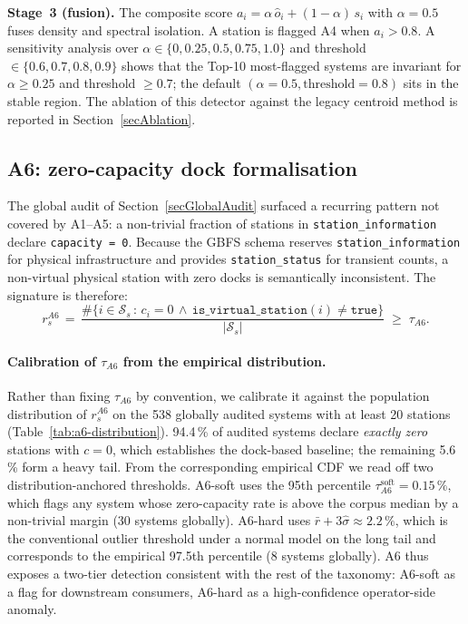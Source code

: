 \documentclass[11pt,a4paper]{article}
\begin{document}
\textbf{Stage~3 (fusion).} The composite score
$a_i = \alpha\,\hat o_i + (1 - \alpha)\,s_i$ with $\alpha = 0.5$
fuses density and spectral isolation. A station is flagged A4 when
$a_i > 0.8$. A sensitivity analysis over
$\alpha \in \{0, 0.25, 0.5, 0.75, 1.0\}$ and threshold
$\in \{0.6, 0.7, 0.8, 0.9\}$ shows that the Top-10 most-flagged
systems are invariant for $\alpha \ge 0.25$ and threshold $\ge 0.7$;
the default $(\alpha = 0.5, \text{threshold} = 0.8)$ sits in the
stable region. The ablation of this detector against the legacy
centroid method is reported in Section~\ref{secAblation}.

\subsection{A6: zero-capacity dock formalisation}\label{secA6Formalisation}
The global audit of Section~\ref{secGlobalAudit} surfaced a recurring
pattern not covered by A1--A5: a non-trivial fraction of stations in
\texttt{station\_information} declare \texttt{capacity = 0}. Because
the GBFS schema reserves \texttt{station\_information} for physical
infrastructure and provides \texttt{station\_status} for transient
counts, a non-virtual physical station with zero docks is
semantically inconsistent. The signature is therefore:
\begin{equation}
r_s^{A6} \,=\,
\frac{\#\{i \in \mathcal{S}_s \,:\, c_i = 0 \,\land\, \mathtt{is\_virtual\_station}(i) \neq \mathtt{true}\}}{|\mathcal{S}_s|}
\;\geq\; \tau_{A6}.
\end{equation}

\paragraph{Calibration of $\tau_{A6}$ from the empirical distribution.}
Rather than fixing $\tau_{A6}$ by convention, we calibrate it against
the population distribution of $r_s^{A6}$ on the 538 globally audited
systems with at least 20 stations
(Table~\ref{tab:a6-distribution}). 94.4\,\% of audited systems
declare \emph{exactly zero} stations with $c = 0$, which establishes
the dock-based baseline; the remaining 5.6\,\% form a heavy tail.
From the corresponding empirical CDF we read off two
distribution-anchored thresholds. A6-soft uses the 95th percentile
$\tau_{A6}^{\text{soft}} = 0.15\,\%$, which flags any system whose
zero-capacity rate is above the corpus median by a non-trivial
margin (30 systems globally). A6-hard uses $\bar r + 3\hat\sigma
\approx 2.2\,\%$, which is the conventional outlier threshold under
a normal model on the long tail and corresponds to the empirical
97.5th percentile (8 systems globally). A6 thus exposes a two-tier
detection consistent with the rest of the taxonomy: A6-soft as a
flag for downstream consumers, A6-hard as a high-confidence
operator-side anomaly.
\end{document}
